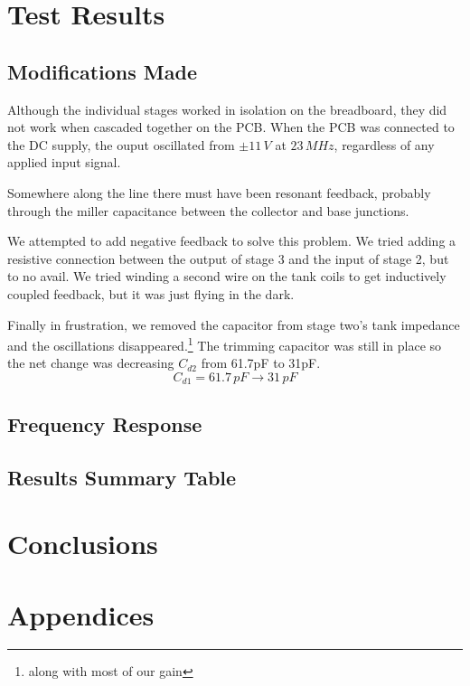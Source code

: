 \documentclass[titlepage, letterpaper, 11pt]{article}
\begin{document}
\section{Test Results}

\subsection{Modifications Made}

Although the individual stages worked in isolation on the
breadboard, they did not work when cascaded together on the PCB.
When the PCB was connected to the DC supply, the ouput oscillated
from $\pm11\,V$ at $23\,MHz$, regardless of any applied input signal.

Somewhere along the line there must have been resonant feedback,
probably through the miller capacitance between the collector and
base junctions.

We attempted to add negative feedback to solve this problem. We tried
adding a resistive connection between the output of stage 3 and the
input of stage 2, but to no avail. We tried winding a second wire on
the tank coils to get inductively coupled feedback, but it was just
flying in the dark.

Finally in frustration, we removed the capacitor from stage two's
tank impedance and the oscillations disappeared.\footnote{along
with most of our gain} The trimming capacitor was still in place
so the net change was decreasing $C_{d2}$ from 61.7pF to 31pF.
\begin{equation*}
C_{d1}=61.7\,pF\rightarrow 31\,pF
\end{equation*}

\subsection{Frequency Response}



\subsection{Results Summary Table}

\section{Conclusions}

\section{Appendices}
\end{document}
